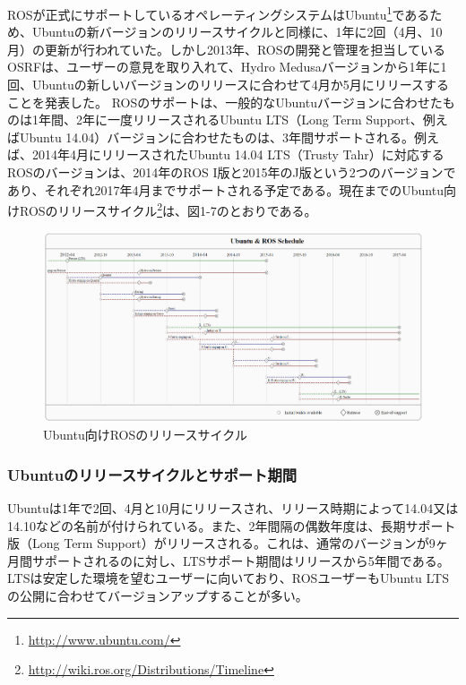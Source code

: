 ROSが正式にサポートしているオペレーティングシステムはUbuntu\footnote{\url{http://www.ubuntu.com/}}であるため、Ubuntuの新バージョンのリリースサイクルと同様に、1年に2回（4月、10月）の更新が行われていた。しかし2013年、ROSの開発と管理を担当しているOSRFは、ユーザーの意見を取り入れて、Hydro Medusaバージョンから1年に1回、Ubuntuの新しいバージョンのリリースに合わせて4月か5月にリリースすることを発表した。
ROSのサポートは、一般的なUbuntuバージョンに合わせたものは1年間、2年に一度リリースされるUbuntu LTS（Long Term Support、例えばUbuntu 14.04）バージョンに合わせたものは、3年間サポートされる。例えば、2014年4月にリリースされたUbuntu 14.04 LTS（Trusty Tahr）に対応するROSのバージョンは、2014年のROS I版と2015年のJ版という2つのバージョンであり、それぞれ2017年4月までサポートされる予定である。現在までのUbuntu向けROSのリリースサイクル\footnote{\url{http://wiki.ros.org/Distributions/Timeline}}は、図1-7のとおりである。\\

\begin{figure}[h]
  \centering
  \includegraphics[width=\columnwidth]{pictures/chapter1/pic_01_07.png}
  \caption{Ubuntu向けROSのリリースサイクル}
\end{figure}

\subsubsection{Ubuntuのリリースサイクルとサポート期間}

Ubuntuは1年で2回、4月と10月にリリースされ、リリース時期によって14.04又は14.10などの名前が付けられている。また、2年間隔の偶数年度は、長期サポート版（Long Term Support）がリリースされる。これは、通常のバージョンが9ヶ月間サポートされるのに対し、LTSサポート期間はリリースから5年間である。LTSは安定した環境を望むユーザーに向いており、ROSユーザーもUbuntu LTSの公開に合わせてバージョンアップすることが多い。


